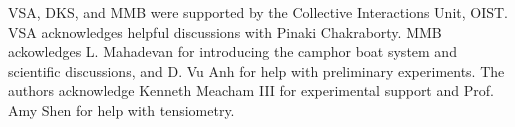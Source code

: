 \documentclass[journal=langd5, manuscript=article, layout=twocolumn]{achemso}
\begin{document}
\begin{acknowledgement}
VSA, DKS, and MMB were supported by the Collective Interactions Unit, OIST. VSA acknowledges helpful discussions with Pinaki Chakraborty. MMB ackowledges L. Mahadevan for introducing the camphor boat system and scientific discussions, and D. Vu Anh for help with preliminary experiments. The authors acknowledge Kenneth Meacham III for experimental support and Prof. Amy Shen for help with tensiometry. 
\end{acknowledgement}






\end{document}
